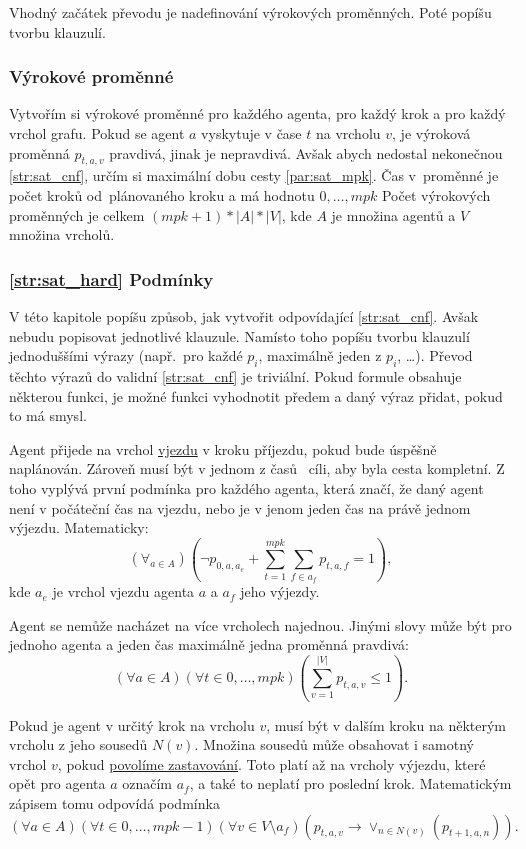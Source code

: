 Vhodný začátek převodu je nadefinování výrokových proměnných.
Poté popíšu tvorbu klauzulí.

\subsubsection{Výrokové proměnné}\label{subsubsec:sat_vyrokove_promenne}

Vytvořím si výrokové proměnné pro každého agenta, pro každý krok a pro každý vrchol grafu.
Pokud se agent $a$ vyskytuje v čase $t$ na vrcholu $v$, je výroková proměnná $p_{t,a,v}$ pravdivá, jinak je nepravdivá.
Avšak abych nedostal nekonečnou \ref{str:sat_cnf}, určím si maximální dobu cesty \ref{par:sat_mpk}.
Čas v~proměnné je počet kroků od~plánovaného kroku a má hodnotu ${0, \dots, mpk}$
Počet výrokových proměnných je celkem $(mpk + 1) * |A| * |V|$, kde $A$ je množina agentů a $V$ množina vrcholů.

\subsubsection{\ref{str:sat_hard} Podmínky}\label{subsubsec:sat_hard_podminky}

V této kapitole popíšu způsob, jak vytvořit odpovídající \ref{str:sat_cnf}.
Avšak nebudu popisovat jednotlivé klauzule.
Namísto toho popíšu tvorbu klauzulí jednoduššími výrazy (např.\ pro každé $p_i$, maximálně jeden z $p_i$, \ldots).
Převod těchto výrazů do validní \ref{str:sat_cnf} je triviální.
Pokud formule obsahuje některou funkci, je možné funkci vyhodnotit předem a daný výraz přidat, pokud to má smysl.

Agent přijede na vrchol \hyperref[par:vjezdy]{vjezdu} v kroku příjezdu, pokud bude úspěšně naplánován.
Zároveň musí být v jednom z časů ~cíli, aby byla cesta kompletní.
Z toho vyplývá první podmínka pro každého agenta, která značí, že daný agent není v počáteční čas na vjezdu,
nebo je v jenom jeden čas na právě jednom výjezdu.
Matematicky:
\[
	(\forall_{a \in A}) \left(\neg p_{0,a,a_e} + \sum_{t=1}^{mpk} \sum_{f \in a_f} p_{t, a, f} = 1\right),
\]
kde $a_e$ je vrchol vjezdu agenta $a$ a $a_f$ jeho výjezdy.

Agent se nemůže nacházet na více vrcholech najednou.
Jinými slovy může být pro jednoho agenta a jeden čas maximálně jedna proměnná pravdivá:
\[
	(\forall a \in A)(\forall t \in {0, \dots, mpk})\left(\sum_{v=1}^{|V|} p_{t,a,v} \leq 1\right).
\]

Pokud je agent v určitý krok na vrcholu $v$, musí být v dalším kroku na některým vrcholu z jeho sousedů $N(v)$.
Množina sousedů může obsahovat i samotný vrchol $v$,
pokud \hyperref[par:sat_povolene_zastavovani]{povolíme zastavování}.
Toto platí až na vrcholy výjezdu, které opět pro agenta $a$ označím $a_f$, a také to neplatí pro poslední krok.
Matematickým zápisem tomu odpovídá podmínka
\[
	(\forall a \in A)(\forall t \in {0, \dots, mpk - 1})
	(\forall v \in V \setminus a_f)(p_{t,a,v} \rightarrow \vee_{n \in N(v)} (p_{t+1,a,n})).
\]

